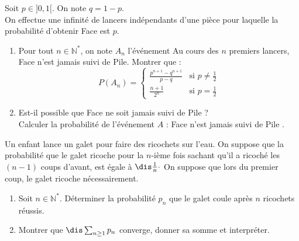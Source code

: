 \documentclass[a4paper,10pt]{report}
\begin{document}
\begin{Exercice}{}
Soit $p \in ]0,1[$. On note $q=1-p$.\\
On effectue une infinité de lancers indépendants d'une pièce pour laquelle la probabilité d'obtenir Face est $p$.
\begin{enumerate}
\item Pour tout $n \in \mathbb{N}^*$, on note $A_n$ l'événement \og Au cours des $n$ premiers lancers, Face n'est jamais suivi de Pile\fg.
Montrer que :
$$P(A_n)=\begin{cases}
{\frac{p^{n+1}-q^{n+1}}{p-q}} & \text{si } p \neq \frac 1 2\\
{\frac{n+1}{2^n}} & \text{si } p=\frac 1 2
\end{cases}$$
\item Est-il possible que Face ne soit jamais suivi de Pile ?\\
Calculer la probabilité de l'événement $A$ : \og Face n'est jamais suivi de Pile \fg.
\end{enumerate}
\end{Exercice}



\begin{Exercice}{} Un enfant lance un galet pour faire des ricochets sur l'eau. On suppose que la probabilité que le galet ricoche pour la $n$-ième fois sachant qu'il a ricoché les $(n-1)$ coups d'avant, est égale à $\dis \frac{1}{n}\cdot$ On suppose que lors du premier coup, le galet ricoche nécessairement.
\begin{enumerate}
\item Soit $n \in \mathbb{N}^*$. Déterminer la probabilité $p_n$ que le galet coule après $n$ ricochets réussis.
\item Montrer que $\dis \sum_{n \geq 1} p_n$ converge, donner sa somme et interpréter.
\end{enumerate}
\end{Exercice}
\end{document}
